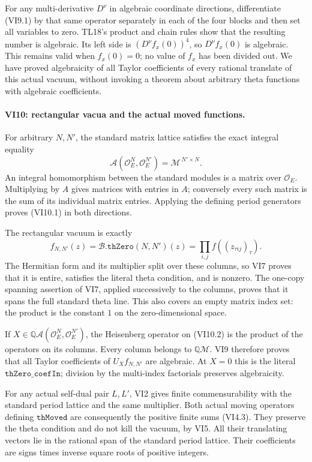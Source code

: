 For any multi-derivative \(D^\nu\) in algebraic coordinate
directions, differentiate (VI9.1) by that same operator
separately in each of the four blocks and then set all
variables to zero. TL18's product and chain rules show that
the resulting number is algebraic. Its left side is
\((D^\nu f_x(0))^4\), so \(D^\nu f_x(0)\) is algebraic.
This remains valid when \(f_x(0)=0\); no value of \(f_x\)
has been divided out. We have proved algebraicity of all
Taylor coefficients of every rational translate of this
actual vacuum, without invoking a theorem about arbitrary
theta functions with algebraic coefficients.

\paragraph{VI10: rectangular vacua and the actual moved functions.}
For arbitrary \(N,N'\), the standard matrix lattice satisfies
the exact integral equality
\[
 \mathcal A(\mathcal O_E^N,\mathcal O_E^{N'})
       =\mathcal M^{\,N'\times N}.
 \tag{VI10.1}
\]
An integral homomorphism between the standard modules is a
matrix over \(\mathcal O_E\). Multiplying by \(A\) gives
matrices with entries in \(A\); conversely every such
matrix is the sum of its individual matrix entries.
Applying the defining period generators proves (VI10.1)
in both directions.

The rectangular vacuum is exactly
\[
 f_{N,N'}(z)=\mathscr B.\texttt{thZero}(N,N')(z)
              =\prod_{i,j} f((z_{\tau ij})_\tau).
 \tag{VI10.2}
\]
The Hermitian form and its multiplier split over these
columns, so VI7 proves that it is entire, satisfies the
literal theta condition, and is nonzero. The one-copy
spanning assertion of VI7, applied successively to the
columns, proves that it spans the full standard theta line.
This also covers an empty matrix index set: the product is
the constant \(1\) on the zero-dimensional space.

If \(X\in\mathbb Q\mathcal A(\mathcal O_E^N,\mathcal O_E^{N'})\),
the Heisenberg operator on (VI10.2) is the product of the
operators on its columns. Every column belongs to
\(\mathbb Q\mathcal M\). VI9 therefore proves that all Taylor
coefficients of \(U_Xf_{N,N'}\) are algebraic. At \(X=0\) this
is the literal \(\texttt{thZero\_coefIn}\); division by the
multi-index factorials preserves algebraicity.

For any actual self-dual pair \(L,L'\), VI2 gives finite
commensurability with the standard period lattice and the
same multiplier. Both actual moving operators defining
\(\texttt{thMoved}\) are consequently the positive finite
sums (VI4.3). They preserve the theta condition and do not
kill the vacuum, by VI5. All their translating vectors lie
in the rational span of the standard period lattice.
Their coefficients are signs times inverse square roots
of positive integers.

